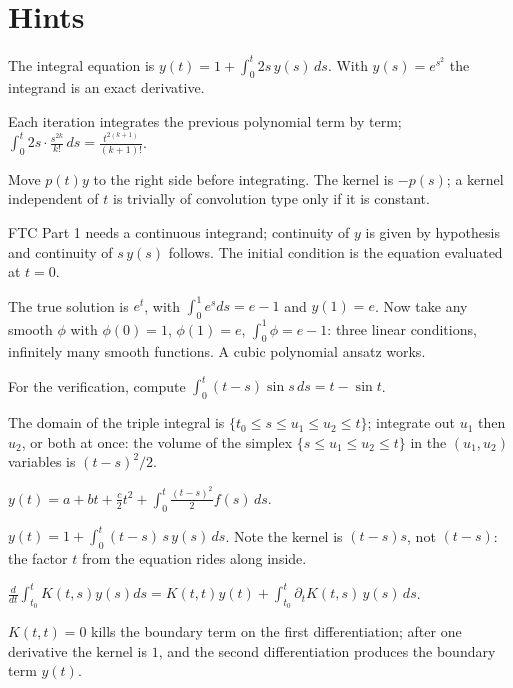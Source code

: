 \documentclass{essay}
\begin{document}
\clearpage
\section{Hints}

\begin{description}[leftmargin=0pt, itemsep=4pt]
\item[\ref{ex:basic}.] The integral equation is $y(t) = 1 + \int_0^t 2s\,y(s)\,ds$. With $y(s) = e^{s^2}$ the integrand is an exact derivative.
\item[\ref{ex:picard}.] Each iteration integrates the previous polynomial term by term; $\int_0^t 2s \cdot \frac{s^{2k}}{k!}\, ds = \frac{t^{2(k+1)}}{(k+1)!}$.
\item[\ref{ex:linear}.] Move $p(t)y$ to the right side before integrating. The kernel is $-p(s)$; a kernel independent of $t$ is trivially of convolution type only if it is constant.
\item[\ref{ex:backward}.] FTC Part 1 needs a continuous integrand; continuity of $y$ is given by hypothesis and continuity of $s\,y(s)$ follows. The initial condition is the equation evaluated at $t = 0$.
\item[\ref{ex:wrongway}.] The true solution is $e^t$, with $\int_0^1 e^s ds = e - 1$ and $y(1) = e$. Now take any smooth $\phi$ with $\phi(0)=1$, $\phi(1)=e$, $\int_0^1 \phi = e - 1$: three linear conditions, infinitely many smooth functions. A cubic polynomial ansatz works.
\item[\ref{ex:sine}.] For the verification, compute $\int_0^t (t-s)\sin s\, ds = t - \sin t$.
\item[\ref{ex:cauchy3}.] The domain of the triple integral is $\{t_0 \le s \le u_1 \le u_2 \le t\}$; integrate out $u_1$ then $u_2$, or both at once: the volume of the simplex $\{s \le u_1 \le u_2 \le t\}$ in the $(u_1, u_2)$ variables is $(t-s)^2/2$.
\item[\ref{ex:thirdorder}.] $y(t) = a + bt + \tfrac{c}{2}t^2 + \int_0^t \frac{(t-s)^2}{2} f(s)\, ds$.
\item[\ref{ex:airy}.] $y(t) = 1 + \int_0^t (t-s)\,s\,y(s)\,ds$. Note the kernel is $(t-s)s$, not $(t-s)$: the factor $t$ from the equation rides along inside.
\item[\ref{ex:leibniz}.] $\frac{d}{dt}\int_{t_0}^t K(t,s)y(s)ds = K(t,t)y(t) + \int_{t_0}^t \partial_t K(t,s)\, y(s)\, ds$.
\item[\ref{ex:twoderivs}.] $K(t,t) = 0$ kills the boundary term on the first differentiation; after one derivative the kernel is $1$, and the second differentiation produces the boundary term $y(t)$.

\end{description}
\end{document}

